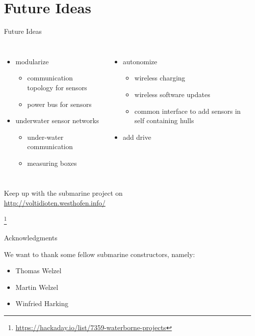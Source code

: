\documentclass{beamer}
\begin{document}
	\section{Future Ideas}
	\begin{frame}{Future Ideas}
		\begin{columns}
			\begin{itemize}
				\item modularize
					\begin{itemize}
						\item communication topology for sensors
						\item power bus for sensors
					\end{itemize}
				\item underwater sensor networks
					\begin{itemize}
						\item under-water communication
						\item measuring boxes
					\end{itemize}
			\end{itemize}
			\begin{itemize}
				\item autonomize
					\begin{itemize}
						\item wireless charging
						\item wireless software updates
						\item common interface to add sensors in self containing hulls
					\end{itemize}
				\item add drive
			\end{itemize}
		\end{columns}
		\begin{mdframed}
			\begin{center}
				Keep up with the submarine project on\\
				\url{http://voltidioten.westhofen.info/}
			\end{center}
		\end{mdframed}
		\let\thefootnote\relax\footnote{\url{https://hackaday.io/list/7359-waterborne-projects}}
	\end{frame}

	\begin{frame}{Acknowledgments}
		\begin{center}
			We want to thank some fellow submarine constructors, namely:
		\end{center}
		\begin{itemize}
			\item Thomas Welzel
			\item Martin Welzel
			\item Winfried Harking
		\end{itemize}
	\end{frame}
\end{document}
